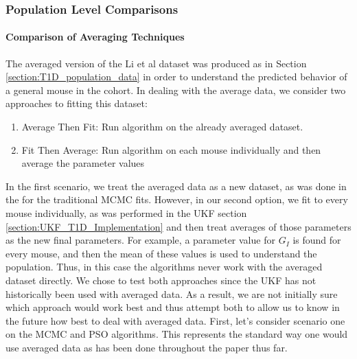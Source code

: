 \subsubsection{Population Level Comparisons}

\paragraph{Comparison of Averaging Techniques}
The averaged version of the Li et al dataset was produced as in Section \ref{section:T1D_population_data} in order to understand the predicted behavior of a general mouse in the cohort. In dealing with the average data, we consider two approaches to fitting this dataset:
\begin{enumerate}
    \item Average Then Fit: Run algorithm on the already averaged dataset.
    \item Fit Then Average: Run algorithm on each mouse individually and then average the parameter values
\end{enumerate}
In the first scenario, we treat the averaged data as a new dataset, as was done in the for the traditional MCMC fits. However, in our second option, we fit to every mouse individually, as was performed in the UKF section \ref{section:UKF_T1D_Implementation} and then treat averages of those parameters as the new final parameters. For example, a parameter value for $G_I$ is found for every mouse, and then the mean of these values is used to understand the population. Thus, in this case the algorithms never work with the averaged dataset directly. We chose to test both approaches since the UKF has not historically been used with averaged data. As a result, we are not initially sure which approach would work best and thus attempt both to allow us to know in the future how best to deal with averaged data. First, let's consider scenario one on the MCMC and PSO algorithms. This represents the standard way one would use averaged data as has been done throughout the paper thus far.




